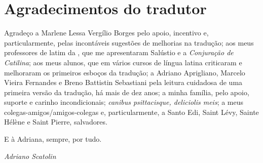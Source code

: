 \section{Agradecimentos do tradutor}

Agradeço a Marlene Lessa Vergílio Borges pelo apoio, incentivo e,
particularmente,  pelas  incontáveis sugestões de melhorias na tradução; aos
meus professores de latim da , que me apresentaram Salústio e a
\emph{Conjuração de Catilina}; aos meus alunos, que em vários
cursos de língua latina criticaram e melhoraram os primeiros esboços da tradução; a Adriano Aprigliano, Marcelo Vieira Fernandes e Breno Battistin Sebastiani pela leitura cuidadosa de uma primeira versão da tradução, há mais de dez anos; a
minha família, pelo apoio, suporte e carinho incondicionais; \emph{canibus psittacisque, deliciolis meis}; a meus colegas-amigos/amigos-colegas e, particularmente, a Santo
Edi, Saint Lévy, Sainte Hélène e Saint Pierre,  salvadores.

\indent\begin{minipage}{\linewidth}
E à Adriana, sempre, por tudo.

\bigskip
\small\hfill \emph{Adriano Scatolin}
\end{minipage}

